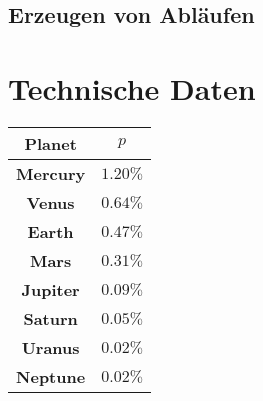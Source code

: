 \documentclass[12pt, a4paper]{report}
\begin{document}
\section{Erzeugen von Abläufen}
\chapter{Technische Daten}
\begin{table}[]
\centering
\begin{tabular}{|c|c|}
\hline
\textbf{Planet}  & \textbf{$p$}      \\ \hline
\textbf{Mercury} & \textbf{$1.20\%$} \\ \hline
\textbf{Venus}   & \textbf{$0.64\%$} \\ \hline
\textbf{Earth}   & \textbf{$0.47\%$} \\ \hline
\textbf{Mars}    & \textbf{$0.31\%$} \\ \hline
\textbf{Jupiter} & \textbf{$0.09\%$} \\ \hline
\textbf{Saturn}  & \textbf{$0.05\%$} \\ \hline
\textbf{Uranus}  & \textbf{$0.02\%$} \\ \hline
\textbf{Neptune} & \textbf{$0.02\%$} \\ \hline
\end{tabular}
\end{table}
\end{document}
